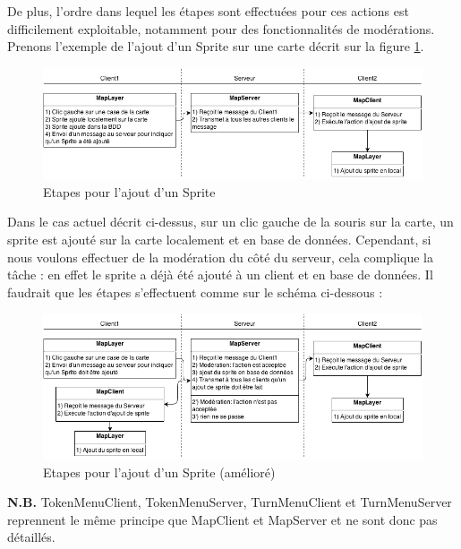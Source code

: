 De plus, l'ordre dans lequel les étapes sont effectuées pour ces actions est difficilement exploitable, notamment pour des fonctionnalités de modérations. Prenons l'exemple de l'ajout d'un Sprite sur une carte décrit sur la figure \ref{fig:network_addsprite}.
\newpage

\begin{figure}[h!]
	\centering
	\includegraphics[width=1.0\textwidth]{img/network_addsprite.png}
	\caption{Etapes pour l'ajout d'un Sprite}
	\label{fig:network_addsprite}
\end{figure}

Dans le cas actuel décrit ci-dessus, sur un clic gauche de la souris sur la carte, un sprite est ajouté sur la carte localement et en base de données. Cependant, si nous voulons effectuer de la modération du côté du serveur, cela complique la tâche : en effet le sprite a déjà été ajouté à un client et en base de données. Il faudrait que les étapes s'effectuent comme sur le schéma ci-dessous :

\begin{figure}[h!]
	\centering
	\includegraphics[width=1.0\textwidth]{img/network_addsprite_better.png}
	\caption{Etapes pour l'ajout d'un Sprite (amélioré)}
\end{figure}

\textbf{N.B.} TokenMenuClient, TokenMenuServer, TurnMenuClient et TurnMenuServer reprennent le même principe que MapClient et MapServer et ne sont donc pas détaillés.

